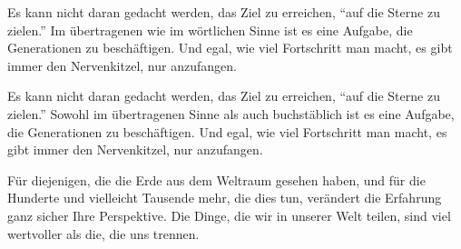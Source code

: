 Es kann nicht daran gedacht werden, das Ziel zu erreichen, \enquote{auf die Sterne zu zielen.} Im übertragenen wie im wörtlichen Sinne ist es eine Aufgabe, die Generationen zu beschäftigen. Und egal, wie viel Fortschritt man macht, es gibt immer den Nervenkitzel, nur anzufangen.

Es kann nicht daran gedacht werden, das Ziel zu erreichen, \enquote{auf die Sterne zu zielen.} Sowohl im übertragenen Sinne als auch buchstäblich ist es eine Aufgabe, die Generationen zu beschäftigen. Und egal, wie viel Fortschritt man macht, es gibt immer den Nervenkitzel, nur anzufangen.

Für diejenigen, die die Erde aus dem Weltraum gesehen haben, und für die Hunderte und vielleicht Tausende mehr, die dies tun, verändert die Erfahrung ganz sicher Ihre Perspektive. Die Dinge, die wir in unserer Welt teilen, sind viel wertvoller als die, die uns trennen. 
